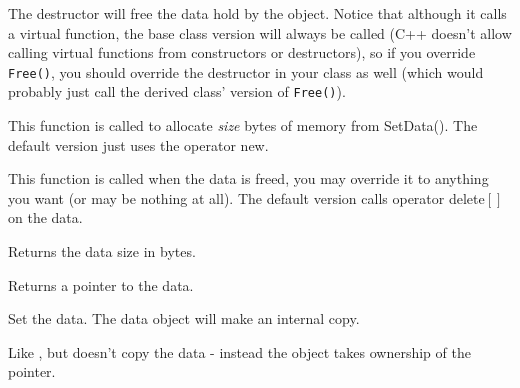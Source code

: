\label{wxcustomdataobjectdtor}


The destructor will free the data hold by the object. Notice that although it
calls a virtual  function, the base
class version will always be called (C++ doesn't allow calling virtual
functions from constructors or destructors), so if you override {\tt Free()}, you
should override the destructor in your class as well (which would probably
just call the derived class' version of {\tt Free()}).

\label{wxcustomdataobjectalloc}


This function is called to allocate {\it size} bytes of memory from SetData().
The default version just uses the operator new.

\label{wxcustomdataobjectfree}



This function is called when the data is freed, you may override it to anything
you want (or may be nothing at all). The default version calls operator
delete$[]$ on the data.

\label{wxcustomdataobjectgetsize}


Returns the data size in bytes.

\label{wxcustomdataobjectgetdata}


Returns a pointer to the data.

\label{wxcustomdataobjectsetdata}


Set the data. The data object will make an internal copy.

\label{wxcustomdataobjecttakedata}


Like , but doesn't copy the data -
instead the object takes ownership of the pointer.

